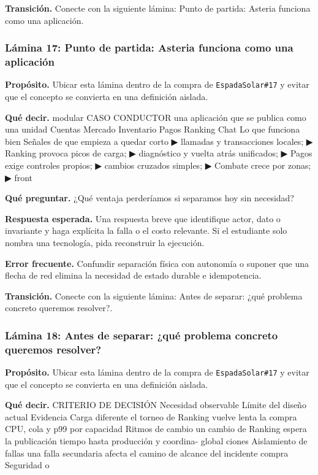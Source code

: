 \documentclass[variant=docente,cover=institutional,mode=screen]{ua-engineering-v6-article}
\begin{document}
\textbf{Transición.} Conecte con la siguiente lámina: Punto de partida:                           Asteria funciona como una aplicación.

\subsubsection*{Lámina 17: Punto de partida:                           Asteria funciona como una aplicación}
\textbf{Propósito.} Ubicar esta lámina dentro de la compra de \texttt{EspadaSolar\#17} y evitar que el concepto se convierta en una definición aislada.

\textbf{Qué decir.} modular CASO CONDUCTOR una aplicación que se publica como una unidad Cuentas Mercado Inventario Pagos Ranking Chat Lo que funciona bien Señales de que empieza a quedar corto ▶ llamadas y transacciones locales; ▶ Ranking provoca picos de carga; ▶ diagnóstico y vuelta atrás unificados; ▶ Pagos exige controles propios; ▶ cambios cruzados simples; ▶ Combate crece por zonas; ▶ front

\textbf{Qué preguntar.} ¿Qué ventaja perderíamos si separamos hoy sin necesidad?

\textbf{Respuesta esperada.} Una respuesta breve que identifique actor, dato o invariante y haga explícita la falla o el costo relevante. Si el estudiante solo nombra una tecnología, pida reconstruir la ejecución.

\textbf{Error frecuente.} Confundir separación física con autonomía o suponer que una flecha de red elimina la necesidad de estado durable e idempotencia.

\textbf{Transición.} Conecte con la siguiente lámina: Antes de separar: ¿qué problema concreto queremos resolver?.

\subsubsection*{Lámina 18: Antes de separar: ¿qué problema concreto queremos resolver?}
\textbf{Propósito.} Ubicar esta lámina dentro de la compra de \texttt{EspadaSolar\#17} y evitar que el concepto se convierta en una definición aislada.

\textbf{Qué decir.} CRITERIO DE DECISIÓN Necesidad observable Límite del diseño actual Evidencia Carga diferente el torneo de Ranking vuelve lenta la compra CPU, cola y p99 por capacidad Ritmos de cambio un cambio de Ranking espera la publicación tiempo hasta producción y coordina- global ciones Aislamiento de fallas una falla secundaria afecta el camino de alcance del incidente compra Seguridad o
\end{document}
